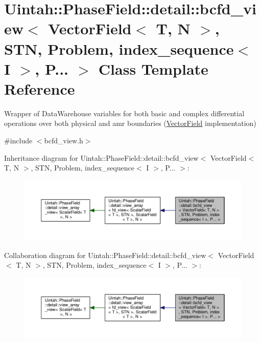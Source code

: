 \hypertarget{classUintah_1_1PhaseField_1_1detail_1_1bcfd__view_3_01VectorField_3_01T_00_01N_01_4_00_01STN_00_1a8b5a6da126f9f6f13d940aa745f239}{}\section{Uintah\+:\+:Phase\+Field\+:\+:detail\+:\+:bcfd\+\_\+view$<$ Vector\+Field$<$ T, N $>$, S\+TN, Problem, index\+\_\+sequence$<$ I $>$, P... $>$ Class Template Reference}
\label{classUintah_1_1PhaseField_1_1detail_1_1bcfd__view_3_01VectorField_3_01T_00_01N_01_4_00_01STN_00_1a8b5a6da126f9f6f13d940aa745f239}


Wrapper of Data\+Warehouse variables for both basic and complex differential operations over both physical and amr boundaries (\hyperlink{structUintah_1_1PhaseField_1_1VectorField}{Vector\+Field} implementation)  




{\ttfamily \#include $<$bcfd\+\_\+view.\+h$>$}



Inheritance diagram for Uintah\+:\+:Phase\+Field\+:\+:detail\+:\+:bcfd\+\_\+view$<$ Vector\+Field$<$ T, N $>$, S\+TN, Problem, index\+\_\+sequence$<$ I $>$, P... $>$\+:\nopagebreak
\begin{figure}[H]
\begin{center}
\leavevmode
\includegraphics[width=350pt]{classUintah_1_1PhaseField_1_1detail_1_1bcfd__view_3_01VectorField_3_01T_00_01N_01_4_00_01STN_00_8d05db2faf7551b95d679fd8b325dfc5}
\end{center}
\end{figure}


Collaboration diagram for Uintah\+:\+:Phase\+Field\+:\+:detail\+:\+:bcfd\+\_\+view$<$ Vector\+Field$<$ T, N $>$, S\+TN, Problem, index\+\_\+sequence$<$ I $>$, P... $>$\+:\nopagebreak
\begin{figure}[H]
\begin{center}
\leavevmode
\includegraphics[width=350pt]{classUintah_1_1PhaseField_1_1detail_1_1bcfd__view_3_01VectorField_3_01T_00_01N_01_4_00_01STN_00_fc119c0eacbe638f2e815d7892dd3902}
\end{center}
\end{figure}

